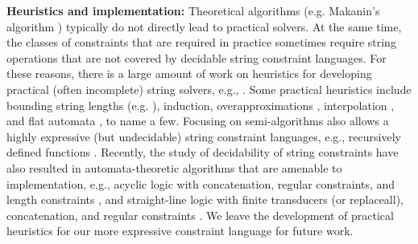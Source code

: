 



\smallskip
\noindent
\textbf{Heuristics and implementation:}
Theoretical algorithms
(e.g. Makanin's algorithm \cite{Makanin}) typically do not directly lead to 
practical solvers. At the same time, the classes of constraints that are 
required in practice sometimes require string operations that are not covered by
decidable string constraint languages.
For these reasons,
there is a large amount of work on heuristics for developing practical
(often incomplete) string solvers, e.g., 
\cite{BTV09,Berkeley-JavaScript,HAMPI,Stranger,YABI14,Abdulla14,fang-yu-circuits,Abdulla17,HJLRV18,S3,TCJ16,Z3-str,Z3-str2,cvc4,Saner,RVG12}.
Some practical heuristics include
bounding string lengths (e.g. \cite{HAMPI,Berkeley-JavaScript,BTV09}), 
induction, overapproximations \cite{Stranger,YABI14}, interpolation
\cite{Abdulla14}, and flat automata \cite{Abdulla17}, to name a few. 
Focusing on semi-algorithms also allows a highly expressive (but undecidable) 
string 
constraint languages, e.g., recursively defined functions \cite{S3,TCJ16}. 
Recently, the study of decidability of string constraints have also resulted in
automata-theoretic algorithms that are amenable to implementation, e.g.,
acyclic logic with concatenation, regular constraints, and length constraints 
\cite{Abdulla14}, and straight-line logic with finite transducers (or
replaceall), concatenation, and regular constraints 
\cite{HJLRV18,fang-yu-circuits,yan-tool}. 
We leave the development of practical heuristics for our more expressive 
constraint language for future work.

